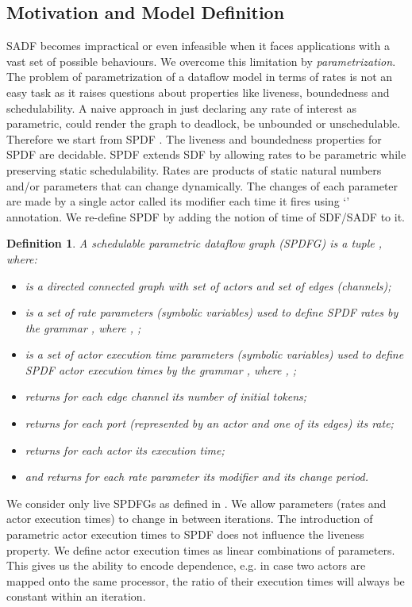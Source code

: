 \documentclass[]{eptcs}
\newtheorem{mydef}{Definition}
\begin{document}
\subsection{Motivation and Model Definition}
SADF becomes impractical or even infeasible when it faces applications with a vast set of possible behaviours. We overcome this limitation by \textit{parametrization}. The problem of parametrization of a dataflow model in terms of rates is not an easy task as it raises questions about properties like liveness, boundedness and schedulability. A naive approach in just declaring any rate of interest as parametric, could render the graph to deadlock, be unbounded or unschedulable. Therefore we start from SPDF \cite{2frad:all}. The liveness and boundedness properties for SPDF are decidable. SPDF extends SDF by allowing rates to be parametric while preserving static schedulability. Rates are products of static natural numbers and/or parameters that can change dynamically. The changes of each parameter  are made by a single actor called its modifier each  time it fires using `' annotation. We re-define SPDF \cite{2frad:all} by adding the notion of time of SDF/SADF to it.
\begin{mydef}
A schedulable parametric dataflow graph (SPDFG) is a tuple   , where:
\label{def:psadf}
\begin{itemize}
\item  is a directed connected graph  with  set of actors and  set of edges (\textit{channels});
\item  is a set of rate parameters (symbolic variables) used to define SPDF rates by the grammar , where , ;
\item  is a set of actor execution time parameters (symbolic variables) used to define SPDF actor execution times by the grammar , where , ;
\item  returns for each edge \textit{channel} its number of initial tokens;
\item  returns for each port (represented by an actor and one of its edges) its rate;
\item  returns for each actor its execution time;
\item  and  returns for each rate parameter its modifier and its change period.
\end{itemize}
\end{mydef}
We consider only live SPDFGs as defined in \cite{2frad:all}. We allow parameters (rates and actor execution times) to change in between iterations. The introduction of parametric actor execution times to SPDF does not influence the liveness property. We define actor execution times as linear combinations of parameters. This gives us the ability to encode dependence, e.g. in case two actors are mapped onto the same processor, the ratio of their execution times will always be constant within an iteration.
\end{document}
